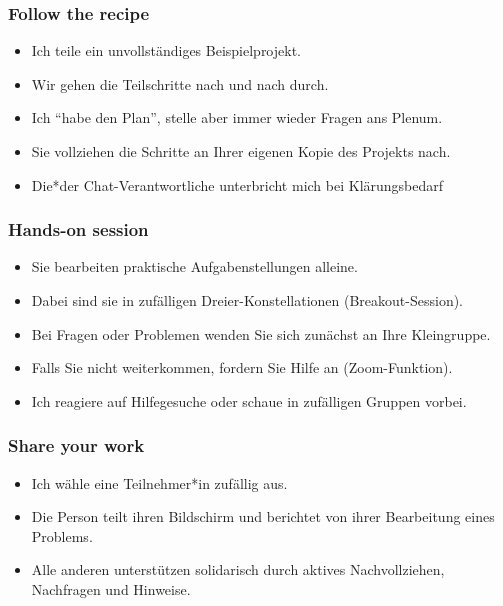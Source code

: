 \documentclass[
  ngerman,
]{article}
\providecommand{\tightlist}{%
  \setlength{\itemsep}{0pt}\setlength{\parskip}{0pt}}
\begin{document}
\hypertarget{follow-the-recipe}{%
\subsubsection{Follow the recipe}\label{follow-the-recipe}}

\begin{itemize}
\tightlist
\item
  Ich teile ein unvollständiges Beispielprojekt.
\item
  Wir gehen die Teilschritte nach und nach durch.
\item
  Ich ``habe den Plan'', stelle aber immer wieder Fragen ans Plenum.
\item
  Sie vollziehen die Schritte an Ihrer eigenen Kopie des Projekts nach.
\item
  Die*der Chat-Verantwortliche unterbricht mich bei Klärungsbedarf
\end{itemize}

\hypertarget{hands-on-session}{%
\subsubsection{Hands-on session}\label{hands-on-session}}

\begin{itemize}
\tightlist
\item
  Sie bearbeiten praktische Aufgabenstellungen alleine.
\item
  Dabei sind sie in zufälligen Dreier-Konstellationen (Breakout-Session).
\item
  Bei Fragen oder Problemen wenden Sie sich zunächst an Ihre Kleingruppe.
\item
  Falls Sie nicht weiterkommen, fordern Sie Hilfe an (Zoom-Funktion).
\item
  Ich reagiere auf Hilfegesuche oder schaue in zufälligen Gruppen vorbei.
\end{itemize}

\hypertarget{share-your-work}{%
\subsubsection{Share your work}\label{share-your-work}}

\begin{itemize}
\tightlist
\item
  Ich wähle eine Teilnehmer*in zufällig aus.
\item
  Die Person teilt ihren Bildschirm und berichtet von ihrer Bearbeitung eines Problems.
\item
  Alle anderen unterstützen solidarisch durch aktives Nachvollziehen, Nachfragen und Hinweise.
\end{itemize}
\end{document}
